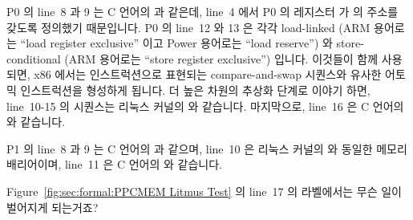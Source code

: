 P0 의 line~8 과 9 는 C 언어의  과 같은데, line~4 에서 P0 의 레지스터
 가  의 주소를 갖도록 정의했기 때문입니다.
P0 의 line~12 와 13 은 각각 load-linked (ARM 용어로는 ``load register
exclusive'' 이고 Power 용어로는 ``load reserve'') 와 store-conditional (ARM
용어로는 ``store register exclusive'') 입니다.
이것들이 함께 사용되면, x86 에서는  인스트럭션으로 표현되는
compare-and-swap 시퀀스와 유사한 어토믹 인스트럭션을 형성하게 됩니다.
더 높은 차원의 추상화 단계로 이야기 하면, line~10-15 의 시퀀스는 리눅스 커널의
 와 같습니다.
마지막으로, line~16 은 C 언어의  와 같습니다.

P1 의 line~8 과 9 는 C 언어의  과 같으며, line~10 은 리눅스 커널의
 와 동일한 메모리 배리어이며, line~11 은 C 언어의  와
같습니다.
\iffalse

P0's lines~8 and~9 are equivalent to the C statement \co{x=1} because
line~4 defines P0's register \co{r2} to be the address of \co{x}. P0's
lines~12 and~13 are the mnemonics for load-linked (``load register
exclusive'' in ARM parlance and ``load reserve'' in Power parlance)
and store-conditional (``store register exclusive'' in ARM parlance),
respectively. When these are used together, they form an atomic
instruction sequence, roughly similar to the compare-and-swap sequences
exemplified by the x86 \co{lock;cmpxchg} instruction. Moving to a higher
level of abstraction, the sequence from lines~10-15 is equivalent to
the Linux kernel's \co{atomic_add_return(&z, 0)}. Finally, line~16 is
roughly equivalent to the C statement \co{r3=y}.

P1's lines~8 and~9 are equivalent to the C statement \co{y=1}, line~10
is a memory barrier, equivalent to the Linux kernel statement \co{smp_mb()},
and line~11 is equivalent to the C statement \co{r3=x}.
\fi

\QuickQuiz{}
	Figure~\ref{fig:sec:formal:PPCMEM Litmus Test} 의 line~17 의 
	라벨에서는 무슨 일이 벌어지게 되는거죠?
	\iffalse

